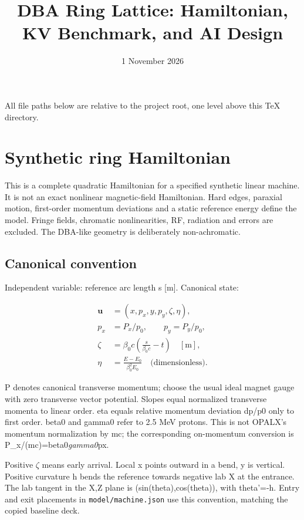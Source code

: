 \documentclass[
  11pt,
  a4paper,
]{article}
\title{DBA Ring Lattice: Hamiltonian, KV Benchmark, and AI Design}
\author{}
\date{1 November 2026}
\begin{document}
\maketitle

All file paths below are relative to the project root, one level above
this TeX directory.

\section{Synthetic ring Hamiltonian}\label{synthetic-ring-hamiltonian}

This is a complete quadratic Hamiltonian for a specified synthetic
linear machine. It is not an exact nonlinear magnetic-field Hamiltonian.
Hard edges, paraxial motion, first-order momentum deviations and a
static reference energy define the model. Fringe fields, chromatic
nonlinearities, RF, radiation and errors are excluded. The DBA-like
geometry is deliberately non-achromatic.

\subsection{Canonical convention}\label{canonical-convention}

Independent variable: reference arc length s {[}m{]}. Canonical state:

\[
\begin{aligned}
\mathbf u&=(x,p_x,y,p_y,\zeta,\eta),\\
p_x&=P_x/p_0,\qquad p_y=P_y/p_0,\\
\zeta&=\beta_0c\left(\frac{s}{\beta_0c}-t\right)\quad[\mathrm m],\\
\eta&=\frac{E-E_0}{\beta_0^2E_0}\quad\text{(dimensionless)}.
\end{aligned}
\]

P denotes canonical transverse momentum; choose the usual ideal magnet
gauge with zero transverse vector potential. Slopes equal normalized
transverse momenta to linear order. eta equals relative momentum
deviation dp/p0 only to first order. beta0 and gamma0 refer to 2.5 MeV
protons. This is not OPALX's momentum normalization by mc; the
corresponding on-momentum conversion is P\_x/(mc)=beta0\emph{gamma0}px.

Positive \(\zeta\) means early arrival. Local x points outward in a
bend, y is vertical. Positive curvature h bends the reference towards
negative lab X at the entrance. The lab tangent in the X,Z plane is
(sin(theta),cos(theta)), with theta'=-h. Entry and exit placements in
\texttt{model/machine.json} use this convention, matching the copied
baseline deck.
\end{document}

